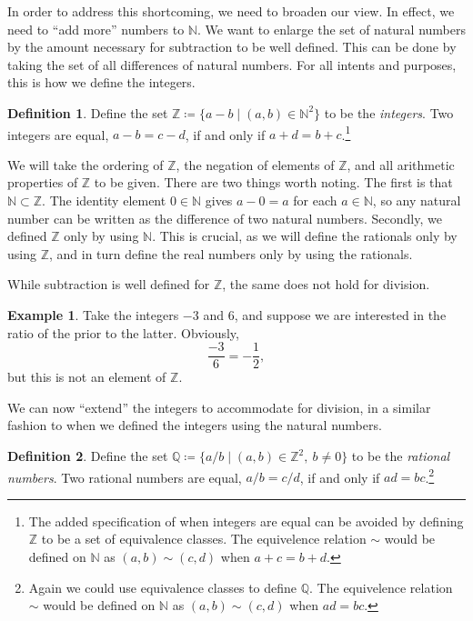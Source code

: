 \documentclass{article}
\newcommand{\N}{\mathbb{N}}
\newcommand{\Q}{\mathbb{Q}}
\newcommand{\Z}{\mathbb{Z}}
\theoremstyle{definition}
\newtheorem{definition}{Definition}[section]
\newtheorem{example}{Example}[section]
\begin{document}
In order to address this shortcoming, we need to broaden our view. In effect, we need to ``add more'' numbers to $ \N $. We want to enlarge the set of natural numbers by the amount necessary for subtraction to be well defined. This can be done by taking the set of all differences of natural numbers. For all intents and purposes, this is how we define the integers. 
\begin{definition}
	Define the set $ \Z\coloneqq\{a-b\mid(a,b)\in\N^2\} $ to be the \textit{\color{red}integers}. Two integers are equal, $ a-b=c-d $, if and only if $ a+d=b+c $.\footnote{The added specification of when integers are equal can be avoided by defining $ \Z $ to be a set of equivalence classes. The equivelence relation $ \sim $ would be defined on $ \N $ as $ (a,b)\sim(c,d) $ when $ a+c=b+d $.}  
\end{definition}
\noindent We will take the ordering of $ \Z $, the negation of elements of $ \Z $, and all arithmetic properties of $ \Z $ to be given. There are two things worth noting. The first is that $ \N\subset\Z $. The identity element $ 0\in\N $ gives $ a-0=a $ for each $ a\in\N $, so any natural number can be written as the difference of two natural numbers. Secondly, we defined $ \Z $ only by using $ \N $. This is crucial, as we will define the rationals only by using $ \Z $, and in turn define the real numbers only by using the rationals.

While subtraction is well defined for $ \Z $, the same does not hold for division. 
\begin{example}
 Take the integers $ -3 $ and 6, and suppose we are interested in the ratio of the prior to the latter. Obviously, $$ \frac{-3}{6}=-\frac{1}{2} ,$$ but this is not an element of $ \Z $. 
\end{example}
We can now ``extend'' the integers to accommodate for division, in a similar fashion to when we defined the integers using the natural numbers. 
\begin{definition}
	Define the set $ \Q\coloneqq\{a/b\mid(a,b)\in\Z^2,\ b\neq0\} $ to be the \textit{\color{red}rational numbers}. Two rational numbers are equal, $ a/b=c/d $, if and only if $ ad=bc $.\footnote{Again we could use equivalence classes to define $ \Q $. The equivelence relation $ \sim $ would be defined on $ \N $ as $ (a,b)\sim(c,d) $ when $ ad=bc $.}  
\end{definition}
\end{document}
